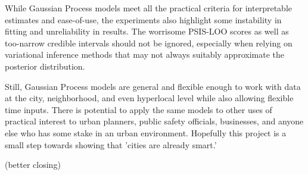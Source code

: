 While Gaussian Process models meet all the practical criteria for interpretable estimates and ease-of-use, the experiments also highlight some instability in fitting and unreliability in results. The worrisome PSIS-LOO scores as well as too-narrow credible intervals should not be ignored, especially when relying on variational inference methods that may not always suitably approximate the posterior distribution. \par

Still, Gaussian Process models are general and flexible enough to work with data at the city, neighborhood, and even hyperlocal level while also allowing flexible time inputs. There is potential to apply the same models to other uses of practical interest to urban planners, public safety officials, businesses, and anyone else who has some stake in an urban environment. Hopefully this project is a small step towards showing that 'cities are already smart.'


\todo(better closing)
